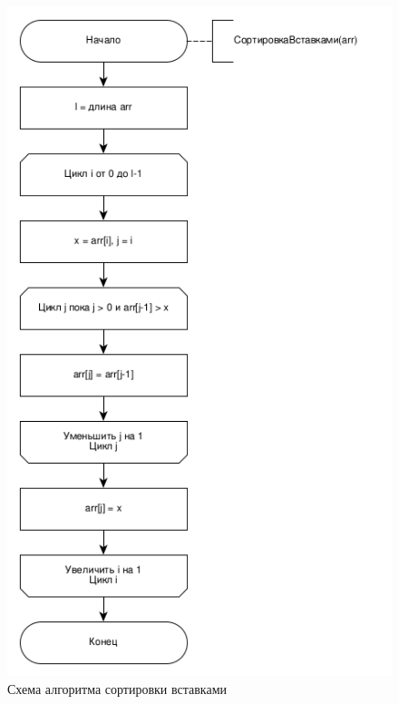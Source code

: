 \documentclass[14pt,russian]{scrartcl}
\begin{document}
\begin{figure}[h]
	\centering
	\includegraphics[scale=1]{insertion.png}
	\caption{Схема алгоритма сортировки вставками}
	\label{fig:insertion}
\end{figure}
\end{document}
